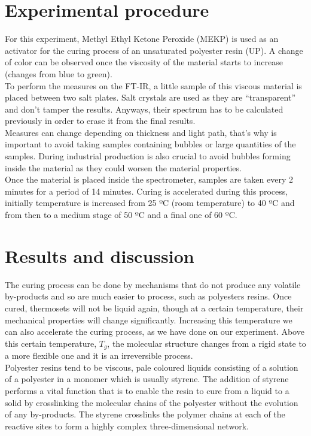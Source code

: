 \section{Experimental procedure}

For this experiment, Methyl Ethyl Ketone Peroxide (MEKP) is used as an activator
for the curing process of an unsaturated polyester resin (UP). A change of color can
be observed once the viscosity of the material starts to increase (changes from
blue to green).\\

To perform the measures on the FT-IR, a little sample of this viscous material
is placed between two salt plates. Salt crystals are used as they are “transparent”
and don’t tamper the results. Anyways, their spectrum has to be calculated previously
in order to erase it from the final results.\\

Measures can change depending on thickness and light path, that’s why is important
to avoid taking samples containing bubbles or large quantities of the samples.
During industrial production is also crucial to avoid bubbles forming inside the
material as they could worsen the material properties.\\

Once the material is placed inside the spectrometer, samples are taken every 2
minutes for a period of 14 minutes. Curing is accelerated during this process,
initially temperature is increased from 25 ºC (room temperature) to 40 ºC and
from then to a medium stage of 50 ºC and a final one of 60 ºC.\\

\section{Results and discussion}
The curing process can be done by mechanisms that do not produce any volatile
by-products and so are much easier to process, such as polyesters resins. Once
cured, thermosets will not be liquid again, though at a certain temperature,
their mechanical properties will change significantly. Increasing this temperature
we can also accelerate the curing process, as we have done on our experiment.
Above this certain temperature, $T_g$, the molecular structure changes from a rigid
state to a more flexible one and it is an irreversible process.\\

Polyester resins tend to be viscous, pale coloured liquids consisting of a solution
of a polyester in a monomer which is usually styrene. The addition of styrene performs
a vital function that is to enable the resin to cure from a liquid to a solid by
crosslinking the molecular chains of the polyester without the evolution of any
by-products. The styrene crosslinks the polymer chains at each of the reactive
sites to form a highly complex three-dimensional network.\\

